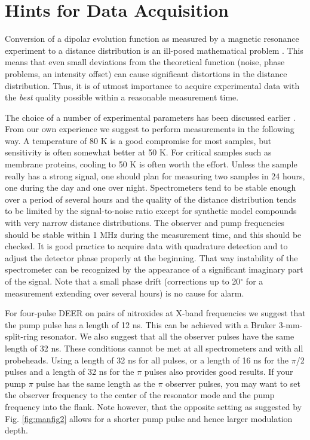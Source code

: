 \documentclass{article}
\begin{document}
\section{Hints for Data Acquisition}
\label{experimental}

Conversion of a dipolar evolution function as measured by a magnetic resonance experiment to a distance distribution is an ill-posed mathematical problem \cite{jeschke2001}. This means that even small deviations from the theoretical function (noise, phase problems, an intensity offset) can cause significant distortions in the distance distribution. Thus, it is of utmost importance to acquire experimental data with the {\em best} quality possible within a reasonable measurement time.

The choice of a number of experimental parameters has been discussed earlier \cite{jeschke2002}. From our own experience we suggest to perform measurements in the following way. A temperature of 80 K is a good compromise for most samples, but sensitivity is often somewhat better at 50 K. For critical samples such as membrane proteins, cooling to 50 K is often worth the effort. Unless the sample really has a strong signal, one should plan for measuring two samples in 24 hours, one during the day and one over night. Spectrometers tend to be stable enough over a period of several hours and the quality of the distance distribution tends to be limited by the signal-to-noise ratio except for synthetic model compounds with very narrow distance distributions. The observer and pump frequencies should be stable within 1 MHz during the measurement time, and this should be checked. It is good practice to acquire data with quadrature detection and to adjust the detector phase properly at the beginning. That way instability of the spectrometer can be recognized by the appearance of a significant imaginary part of the signal. Note that a small phase drift (corrections up to 20$^{\circ}$ for a measurement extending over several hours) is no cause for alarm.

For four-pulse DEER on pairs of nitroxides at X-band frequencies we suggest that the pump pulse has a length of 12 ns. This can be achieved with a Bruker 3-mm-split-ring resonator. We also suggest that all the observer pulses have the same length of 32 ns. These conditions cannot be met at all spectrometers and with all probeheads. Using a length of 32 ns for all pulses, or a length of 16 ns for the $\pi$/2 pulses and a length of 32 ns for the $\pi$ pulses also provides good results. If your pump $\pi$ pulse has the same length as the $\pi$ observer pulses, you may want to set the observer frequency to the center of the resonator mode and the pump frequency into the flank. Note however, that the opposite setting as suggested by Fig. \ref{fig:manfig2} allows for a shorter pump pulse and hence larger modulation depth.
\end{document}
